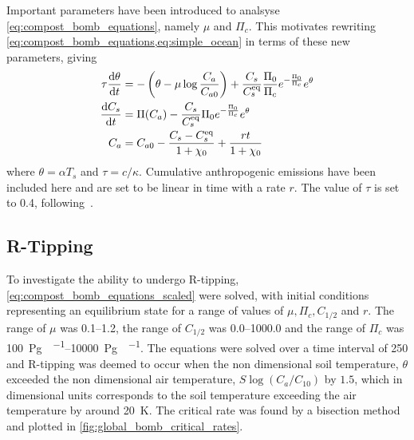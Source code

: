 Important parameters have been introduced to analsyse \cref{eq:compost_bomb_equations}, namely $\mu$ and $\Pi_c$. This motivates rewriting \cref{eq:compost_bomb_equations,eq:simple_ocean}
in terms of these new parameters, giving
\begin{subequations}
  \label{eq:compost_bomb_equations_scaled}
  \begin{align}
    \tau\dv{\theta}{t} &= -\left(\theta - \mu \log \frac{C_a}{C_{a0}}\right) + \frac{C_s}{C_s^{\mathrm{eq}}} \frac{\Pi_0}{\Pi_c} e^{-\frac{\Pi_0}{\Pi_c}} e^{\theta} \\
    \dv{C_s}{t}      &= \Pi(C_a) - \frac{C_s}{C_s^{\mathrm{eq}}} \Pi_0 e^{-\frac{\Pi_0}{\Pi_c}} e^{\theta} \\
    C_a           &= C_{a0} - \frac{C_s - C_s^{\mathrm{eq}}}{1+\chi_0} + \frac{rt}{1+\chi_0}
  \end{align}
\end{subequations}
where $\theta = \alpha T_s$ and $\tau = c/\kappa$. Cumulative anthropogenic emissions have been included here and are set to be linear in time with a rate $r$.
The value of $\tau$ is set to \SI{0.4}{\days}, following~\cite{Luke2011}.

\subsection{R-Tipping}

To investigate the ability to undergo R-tipping, \cref{eq:compost_bomb_equations_scaled} were solved, with initial conditions representing an equilibrium state
for a range of values of $\mu,\Pi_c,C_{1/2}$ and $r$. The range of $\mu$ was \SIrange{0.1}{1.2}{}, the range of $C_{1/2}$ was \SIrange{0.0}{1000.0}{\ppm} and
the range of $\Pi_c$ was \SIrange{100}{10000}{\peta\gram\carbon\per\year}. The equations were solved over a time interval of \SI{250}{\year} and R-tipping was deemed to occur when
the non dimensional soil temperature, $\theta$ exceeded the non dimensional air temperature, $S \log\left(C_a/C_{10}\right)$ by $1.5$, which in dimensional units
corresponds to the soil temperature exceeding the air temperature by around \SI{20}{\kelvin}. The critical rate was found by a bisection method and plotted
in \cref{fig:global_bomb_critical_rates}.

